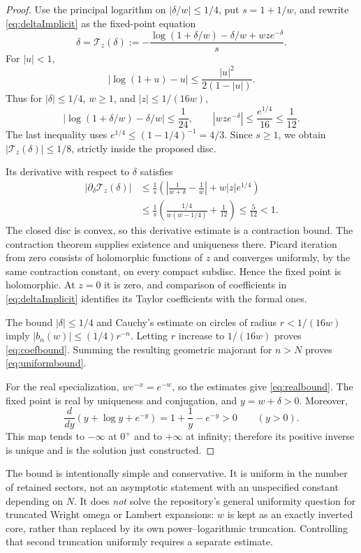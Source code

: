 \documentclass[11pt,a4paper]{article}
\theoremstyle{definition}
\theoremstyle{remark}
\begin{document}
\begin{proof}
Use the principal logarithm on $|\delta/w|\le1/4$, put $s=1+1/w$, and
rewrite \eqref{eq:deltaImplicit} as the fixed-point equation
\begin{equation}\label{eq:contraction}
 \delta=\mathcal T_z(\delta):=
 -\frac{\log(1+\delta/w)-\delta/w+wz e^{-\delta}}{s}.
\end{equation}
For $|u|<1$,
\[
 |\log(1+u)-u|\le\frac{|u|^2}{2(1-|u|)}.
\]
Thus for $|\delta|\le1/4$, $w\ge1$, and $|z|\le1/(16w)$,
\[
 |\log(1+\delta/w)-\delta/w|\le\frac1{24},\qquad
 |wz e^{-\delta}|\le\frac{e^{1/4}}{16}\le\frac1{12}.
\]
The last inequality uses $e^{1/4}\le(1-1/4)^{-1}=4/3$. Since $s\ge1$,
we obtain $|\mathcal T_z(\delta)|\le1/8$, strictly inside the proposed
disc.

Its derivative with respect to $\delta$ satisfies
\begin{align*}
 |\partial_\delta\mathcal T_z(\delta)|
 &\le\frac1s\left(
       \left|\frac1{w+\delta}-\frac1w\right|
       +w|z|e^{1/4}\right)\\
 &\le\frac1s\left(\frac{1/4}{w(w-1/4)}+\frac1{12}\right)
 \le\frac5{12}<1.
\end{align*}
The closed disc is convex, so this derivative estimate is a contraction
bound. The contraction theorem supplies existence and uniqueness there.
Picard iteration from zero consists of holomorphic functions of $z$ and
converges uniformly, by the same contraction constant, on every compact
subdisc. Hence the fixed point is holomorphic. At $z=0$ it is zero, and
comparison of coefficients in \eqref{eq:deltaImplicit} identifies its
Taylor coefficients with the formal ones.

The bound $|\delta|\le1/4$ and Cauchy's estimate on circles of radius
$r<1/(16w)$ imply $|b_n(w)|\le(1/4)r^{-n}$. Letting $r$ increase to
$1/(16w)$ proves \eqref{eq:coefbound}. Summing the resulting geometric
majorant for $n>N$ proves \eqref{eq:uniformbound}.

For the real specialization, $we^{-x}=e^{-w}$, so the estimates give
\eqref{eq:realbound}. The fixed point is real by uniqueness and conjugation,
and $y=w+\delta>0$. Moreover,
\[
 \frac{d}{dy}(y+\log y+e^{-y})=1+\frac1y-e^{-y}>0\qquad(y>0).
\]
This map tends to $-\infty$ at $0^+$ and to $+\infty$ at infinity;
therefore its positive inverse is unique and is the solution just
constructed.
\end{proof}

The bound is intentionally simple and conservative. It is uniform in the
number of retained sectors, not an asymptotic statement with an unspecified
constant depending on $N$. It does \emph{not} solve the repository's general
uniformity question for truncated Wright omega or Lambert expansions:
$w$ is kept as an exactly inverted core, rather than replaced by its own
power--logarithmic truncation. Controlling that second truncation uniformly
requires a separate estimate.
\end{document}
